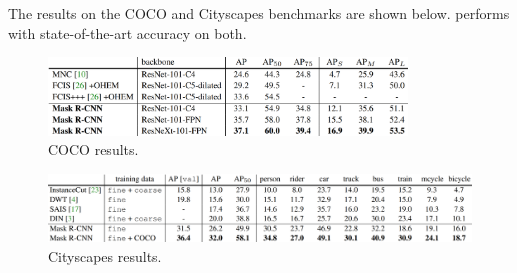 The results on the COCO and Cityscapes benchmarks are shown below. \maskrcnn performs with state-of-the-art accuracy on both.
\begin{figure}[htbp]
	\centering
	\includegraphics[width=0.85\textwidth]{images/cocoresults.PNG} %
	\caption{COCO results.}
\end{figure}
\begin{figure}[htbp]
	\centering
	\includegraphics[width=1\textwidth]{images/cityscapesresults.PNG} %
	\caption{Cityscapes results.}
\end{figure}


